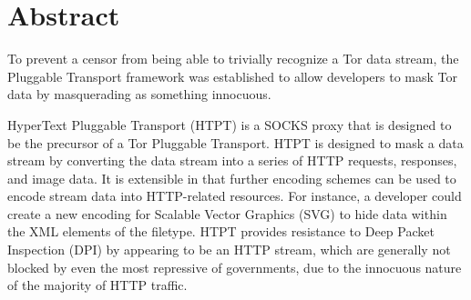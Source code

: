 \section{Abstract}
To prevent a censor from being able to trivially recognize a Tor data stream, the Pluggable Transport framework was established to allow developers to mask Tor data by masquerading as something innocuous. 

HyperText Pluggable Transport (HTPT) is a SOCKS proxy that is designed to be the precursor of a Tor Pluggable Transport. HTPT is designed to mask a data stream by converting the data stream into a series of HTTP requests, responses, and image data. It is extensible in that further encoding schemes can be used to encode stream data into HTTP-related resources. For instance, a developer could create a new encoding for Scalable Vector Graphics (SVG) to hide data within the XML elements of the filetype. HTPT provides resistance to Deep Packet Inspection (DPI) by appearing to be an HTTP stream, which are generally not blocked by even the most repressive of governments, due to the innocuous nature of the majority of HTTP traffic. 
